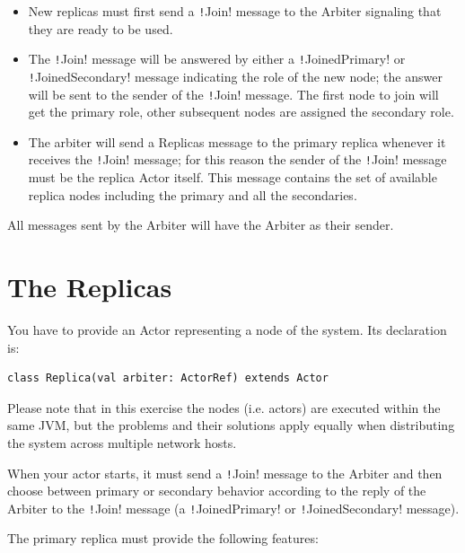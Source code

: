 \documentclass{article}
\begin{document}
\begin{itemize}
    \item New replicas must first send a \texttt!Join! message to the Arbiter signaling that they are ready to be used.
    \item The \texttt!Join! message will be answered by either a \texttt!JoinedPrimary! or \texttt!JoinedSecondary! message indicating the role of the new node; the answer will be sent to the sender of the \texttt!Join! message. The first node to join will get the primary role, other subsequent nodes are assigned the secondary role.
    \item The arbiter will send a Replicas message to the primary replica whenever it receives the \texttt!Join! message; for this reason the sender of the \texttt!Join! message must be the replica Actor itself. This message contains the set of available replica nodes including the primary and all the secondaries.
\end{itemize}

All messages sent by the Arbiter will have the Arbiter as their sender.

\section{The Replicas}\label{s:replicas}

You have to provide an Actor representing a node of the system. Its declaration is:

\begin{verbatim}
class Replica(val arbiter: ActorRef) extends Actor 
\end{verbatim}

Please note that in this exercise the nodes (i.e. actors) are executed within the same JVM, but the problems and their solutions apply equally when distributing the system across multiple network hosts.

When your actor starts, it must send a \texttt!Join! message to the Arbiter and then choose between primary or secondary behavior according to the reply of the Arbiter to the \texttt!Join! message (a \texttt!JoinedPrimary! or \texttt!JoinedSecondary! message).

The primary replica must provide the following features:
\end{document}
